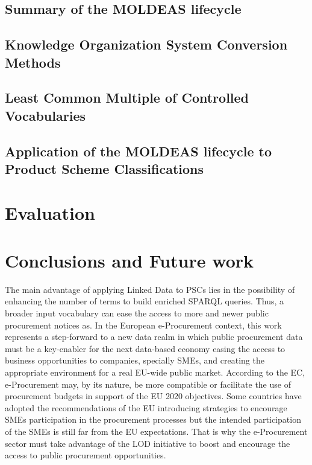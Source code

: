 \documentclass[preprint,12pt]{elsarticle}
\begin{document}
  \subsection{Summary of the MOLDEAS lifecycle}\label{sect:method}
  
  \subsection{Knowledge Organization System Conversion Methods}\label{sect:thesauri}
  
  \subsection{Least Common Multiple of Controlled Vocabularies}\label{sect:least}
  
  \subsection{Application of the MOLDEAS lifecycle to Product Scheme Classifications}\label{sect:use-moldeas}
  

\clearpage
\section{Evaluation}\label{sect:evaluation}

\section{Conclusions and Future work}\label{sect:conclusions}
The main advantage of applying Linked Data to PSCs lies in the possibility of enhancing the number of terms to 
build enriched SPARQL queries. Thus, a broader input vocabulary can ease the access to more and newer 
public procurement notices as. In the European e-Procurement context, this work represents 
a step-forward to a new data realm in which public procurement data must be a key-enabler for the next 
data-based economy easing the access to business opportunities to companies, specially SMEs, 
and creating the appropriate environment for a real EU-wide public market. According to the EC, e-Procurement may, 
by its nature, be more compatible or facilitate the use of procurement budgets in support of the 
EU 2020 objectives. Some countries have adopted the recommendations of the EU introducing strategies to encourage SMEs 
participation in the procurement processes but the intended participation of the SMEs is still far from the EU expectations. 
That is why the e-Procurement sector must take advantage of the LOD initiative to boost and encourage 
the access to public procurement opportunities.
\end{document}
